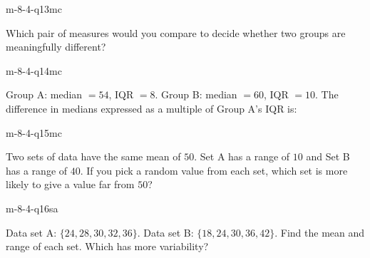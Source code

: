\begin{practiceQuestion}{m-8-4-q13}{mc}
\begin{questionText}
Which pair of measures would you compare to decide whether two groups are meaningfully different?
\end{questionText}
\end{practiceQuestion}

\begin{practiceQuestion}{m-8-4-q14}{mc}
\begin{questionText}
Group A: median $= 54$, IQR $= 8$. Group B: median $= 60$, IQR $= 10$. The difference in medians expressed as a multiple of Group A's IQR is:
\end{questionText}
\end{practiceQuestion}

\begin{practiceQuestion}{m-8-4-q15}{mc}
\begin{questionText}
Two sets of data have the same mean of $50$. Set A has a range of $10$ and Set B has a range of $40$. If you pick a random value from each set, which set is more likely to give a value far from $50$?
\end{questionText}
\end{practiceQuestion}


\begin{practiceQuestion}{m-8-4-q16}{sa}
\begin{questionText}
Data set A: $\{24, 28, 30, 32, 36\}$. Data set B: $\{18, 24, 30, 36, 42\}$. Find the mean and range of each set. Which has more variability?
\end{questionText}
\end{practiceQuestion}

